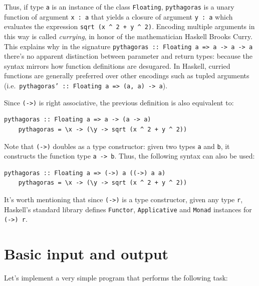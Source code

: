 \documentclass[UdineBachThesis,american,11pt]{PhdThesis}
\begin{document}
  Thus, if type \texttt{a} is an instance of the class \mbox{\texttt{Floating}},
  \mbox{\texttt{pythagoras}} is a unary function of argument
  \mbox{\texttt{x : a}} that yields a closure of argument \mbox{\texttt{y : a}}
  which evaluates the expression
  \mbox{\texttt{sqrt (x {\textasciicircum} 2 + y {\textasciicircum} 2)}}.
  Encoding multiple arguments in this way is called \emph{currying}, in honor of
  the mathematician Haskell Brooks Curry. This explains why in the signature
  \mbox{\texttt{pythagoras :: Floating a => a -> a -> a}} there's no apparent
  distinction between parameter and return types: because the syntax mirrors how
  function definitions are desugared. In Haskell, curried functions are
  generally preferred over other encodings such as tupled arguments (i.e.\
  \mbox{\texttt{pythagoras' :: Floating a => (a, a) -> a}}).

  Since \mbox{\texttt{(->)}} is right associative, the previous definition is
  also equivalent to:

  \begin{Verbatim}[gobble=4,fontsize=\small]
    pythagoras :: Floating a => a -> (a -> a)
    pythagoras = \x -> (\y -> sqrt (x ^ 2 + y ^ 2))
  \end{Verbatim}

  Note that \mbox{\texttt{(->)}} doubles as a type constructor: given two types
  \texttt{a} and \texttt{b}, it constructs the function type
  \mbox{\texttt{a -> b}}. Thus, the following syntax can also be used:

  \begin{Verbatim}[gobble=4,fontsize=\small]
    pythagoras :: Floating a => (->) a ((->) a a)
    pythagoras = \x -> (\y -> sqrt (x ^ 2 + y ^ 2))
  \end{Verbatim}

  It's worth mentioning that since \mbox{\texttt{(->)}} is a type constructor,
  given any type \texttt{r}, Haskell's standard library defines
  \mbox{\texttt{Functor}}, \mbox{\texttt{Applicative}} and \mbox{\texttt{Monad}}
  instances for \mbox{\texttt{(->) r}}.

  \section{Basic input and output}

  Let's implement a very simple program that performs the following task:
\end{document}
